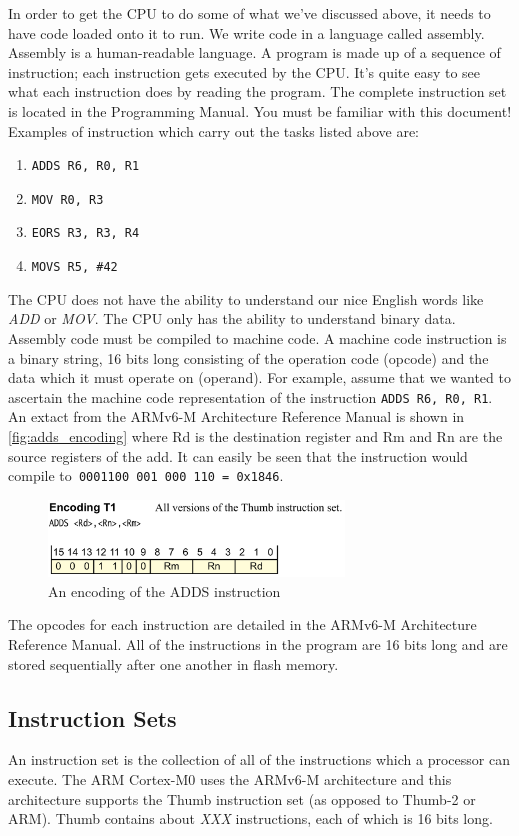 In order to get the CPU to do some of what we've discussed above, it needs to have code loaded onto it to run. We write code in a language called assembly. Assembly is a human-readable language. A program is made up of a sequence of instruction; each instruction gets executed by the CPU. It's quite easy to see what each instruction does by reading the program.  The complete instruction set is located in the Programming Manual. You must be familiar with this document! Examples of instruction which carry out the tasks listed above are:
\begin{enumerate}
  \item \texttt{ADDS R6, R0, R1}
  \item \texttt{MOV R0, R3}
  \item \texttt{EORS R3, R3, R4}
  \item \texttt{MOVS R5, \#42}
\end{enumerate}
The CPU does not have the ability to understand our nice English words like \textit{ADD} or \textit{MOV}. The CPU only has the ability to understand binary data. Assembly code must be compiled to machine code. A machine code instruction is a binary string, 16 bits long consisting of the operation code (opcode) and the data which it must operate on (operand).
For example, assume that we wanted to ascertain the machine code representation of the instruction \texttt{ADDS R6, R0, R1}. An extact from the ARMv6-M Architecture Reference Manual is shown in \autoref{fig:adds_encoding} where Rd is the destination register and Rm and Rn are the source registers of the add. It can easily be seen that the instruction would compile to\texttt{ 0001100 001 000 110 = 0x1846}.
\begin{figure}
\centering
\includegraphics[width=0.7\textwidth]{./week1/adds_encoding}
\caption{An encoding of the ADDS instruction}
\label{fig:adds_encoding}
\end{figure}
The opcodes for each instruction are detailed in the ARMv6-M Architecture Reference Manual.
All of the instructions in the program are 16 bits long and are stored sequentially after one another in flash memory. 

\subsection{Instruction Sets}
An instruction set is the collection of all of the instructions which a processor can execute. 
The ARM Cortex-M0 uses the ARMv6-M architecture and this architecture supports the Thumb instruction set (as opposed to Thumb-2 or ARM). 
Thumb contains about \emph{XXX} instructions, each of which is 16 bits long. \\

